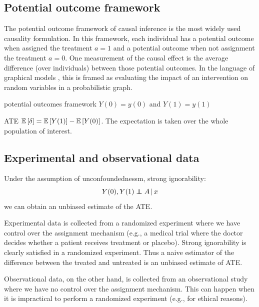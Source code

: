 \subsection{Potential outcome framework}\label{chpt:background:sec:potential}

The potential outcome framework of causal inference \citep{rubin1974ece} is the most widely used causality formulation. In this framework, each individual has a potential outcome when assigned the treatment $a = 1$ and a potential
outcome when not assignment the treatment $a = 0$. One measurement of the causal effect is the average difference (over individuals) between those potential outcomes. In the language of graphical models \citep{pearl2009causality},
this is framed as evaluating the impact of an intervention on random variables in a probabilistic graph. 

\PP potential outcomes framework \citep{rubin1974ece} $Y(0) = y(0)$ and $Y(1) = y(1)$

\PP \gls{ATE} $\mathbb{E}\left[\delta\right] = \mathbb{E}\left[Y(1)\right] - \mathbb{E}\left[Y(0)\right]$. The expectation is taken over the whole population of interest. 

\subsection{Experimental and observational data}

\PP Under the assumption of unconfoundednessm, strong ignorability:
\begin{equation*}
Y(0), Y(1) \indpt A \g x
\end{equation*}
we can obtain an unbiased estimate of the \gls{ATE}.

\PP Experimental data is collected from a randomized experiment where we have control over the assignment mechanism (e.g., a medical trial where the doctor decides whether a patient receives treatment or placebo). Strong ignorability is clearly satisfied in a randomized experiment. Thus a naive estimator of the difference between the treated and untreated is an unbiased estimate of \gls{ATE}. 

\PP Observational data, on the other hand, is collected from an observational study where we have no control over the assignment mechanism. This can happen when it is impractical to perform a randomized experiment (e.g., for ethical reasons). 


\PP \citep{rosenbaum1983central}




